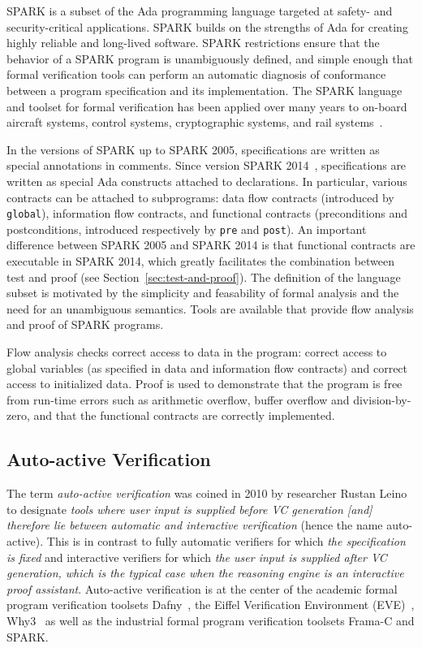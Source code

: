 \documentclass[11pt,a4paper]{article}
\begin{document}
SPARK is a subset of the Ada programming language targeted at safety-
and security-critical applications. SPARK builds on the strengths of
Ada for creating highly reliable and long-lived software. SPARK
restrictions ensure that the behavior of a SPARK program is
unambiguously defined, and simple enough that formal verification
tools can perform an automatic diagnosis of conformance between a
program specification and its implementation. The SPARK language and
toolset for formal verification has been applied over many years to
on-board aircraft systems, control systems, cryptographic systems, and
rail systems~\cite{sparkbook2012,oneill2012}.

In the versions of SPARK up to SPARK 2005, specifications are written as
special annotations in comments. Since version SPARK 2014~\cite{sparkERTS2014},
specifications are written as special Ada constructs attached to
declarations. In particular, various contracts can be attached to subprograms:
data flow contracts (introduced by \texttt{global}), information flow contracts,
and functional contracts (preconditions and postconditions, introduced
respectively by \texttt{pre} and \texttt{post}). An important difference
between SPARK 2005 and SPARK 2014 is that functional contracts are executable in
SPARK 2014, which greatly facilitates the combination between test and proof
(see Section~\ref{sec:test-and-proof}). The definition of the language subset
is motivated by the simplicity and feasability of formal analysis and the need
for an unambiguous semantics. Tools are available that provide flow analysis
and proof of SPARK programs.

Flow analysis checks correct access to data in the program: correct access to
global variables (as specified in data and information flow contracts) and
correct access to initialized data. Proof is used to demonstrate that the
program is free from run-time errors such as arithmetic overflow, buffer
overflow and division-by-zero, and that the functional contracts are correctly
implemented.

\subsection{Auto-active Verification}
\label{sec-prelim-auto-active}

The term \emph{auto-active verification} was coined in 2010 by researcher
Rustan Leino~\cite{Leino10usableauto-active} to designate \textit{tools where
  user input is supplied before VC generation [and] therefore lie between
  automatic and interactive verification} (hence the name auto-active). This is
in contrast to fully automatic verifiers for which \textit{the specification is
  fixed} and interactive verifiers for which \textit{the user input is supplied
  after VC generation, which is the typical case when the reasoning engine is
  an interactive proof assistant}. Auto-active verification is at the center of
the academic formal program verification toolsets Dafny~\cite{Leino2010Dafny},
the Eiffel Verification Environment (EVE)~\cite{Furia2016},
Why3~\cite{filliatre2013Why3} as well as the industrial formal program
verification toolsets Frama-C and SPARK.
\end{document}
